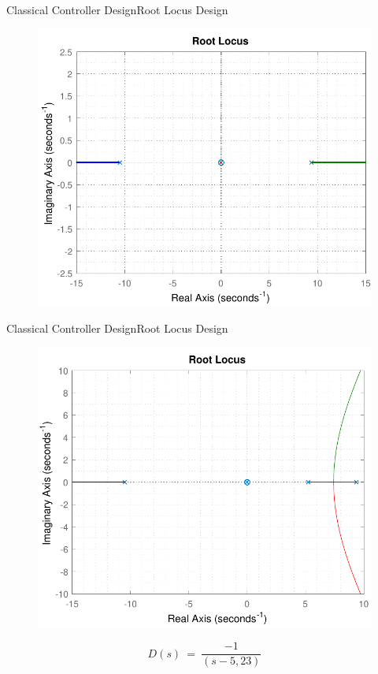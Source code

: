\begin{frame}{Classical Controller Design}{Root Locus Design}	
	\begin{figure}
		\includegraphics[scale=.55]{Pictures/rlocusCubli}
		\centering
	\end{figure}
\end{frame}

\begin{frame}{Classical Controller Design}{Root Locus Design}	
	\begin{figure}
	\includegraphics[scale=.55]{Pictures/RLController1}
	\centering
	\end{figure}
\pause
\begin{displaymath}
\si{D(s)\ =\ \frac{-1}{(s - 5,23)}} \nonumber
\end{displaymath}
\end{frame}

